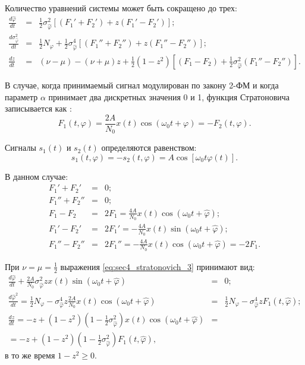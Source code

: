 Количество уравнений системы может быть сокращено до трех:
\begin{eqnarray}
	\label{eq:sec4_stratonovich_3}
	\frac{d \hat{\varphi}}{dt} & = & \frac{1}{2}\sigma_{\hat{\varphi}}^2 \left[(F_{1}' + F_{2}') + z(F_{1}' - F_{2}') \right]; \nonumber \\
	\frac{d \sigma_{\hat{\varphi}}^2}{dt} & = & \frac{1}{2}N_{\varphi} + \frac{1}{2}\sigma_{\hat{\varphi}}^4 \left[ (F_{1}'' + F_{2}'') +  z(F_{1}'' - F_{2}'') \right]; \\
	\frac{dz}{dt} & = & (\nu - \mu) - (\nu + \mu)z + \frac{1}{2}(1 - z^2) \left[ (F_{1} - F_{2}) +  \frac{1}{2} \sigma_{\hat{\varphi}}^2 (F_{1}'' - F_{2}'') \right]. \nonumber
\end{eqnarray}

В случае, когда принимаемый сигнал модулирован по закону 2-ФМ и когда параметр ${\alpha}$ принимает два дискретных значения 0 и 1,
функция Стратоновича записывается как \cite{shahtarin-wiener-kalman}:
\begin{equation}
	\label{eq:sec4_stratonovich_bpsk}
	F_1(t, \varphi) = \frac{2A}{N_0}x(t) \cos (\omega_0 t + \varphi) = -F_2(t, \varphi).
\end{equation}

Сигналы ${s_1(t)}$ и ${s_2(t)}$ определяются равенством: 
\begin{equation}
	\label{eq:sec4_s1_s2}
	s_1(t, \varphi) = -s_2(t, \varphi) = A \cos \left[ \omega_0 t \varphi(t) \right].
\end{equation}

В данном случае:
\begin{eqnarray}
	\label{eq:sec4_strat_der}
	F_1' + F_2' & = & 0; \nonumber \\
	F_1'' + F_2'' & = & 0; \nonumber \\
	F_1 - F_2 & = & 2F_1 = \frac{4A}{N_0}x(t) \cos(\omega_0 t + \hat{\varphi}); \\
	F_1' - F_2' & = & 2F_1' = -\frac{4A}{N_0}x(t) \sin(\omega_0 t + \hat{\varphi}); \nonumber \\
	F_1'' - F_2'' & = & 2F_1'' = -\frac{4A}{N_0}x(t) \cos(\omega_0 t + \hat{\varphi}) = -2F_1. \nonumber
\end{eqnarray}

При ${\nu = \mu = \frac{1}{2}}$ выражения \ref{eq:sec4_stratonovich_3} принимают вид:
\begin{eqnarray}
	\label{eq:sec4_strat_der111}
	\frac{d \hat{\varphi}}{dt} + \frac{2A}{N_0} \sigma_{\hat{\varphi}}^2 z x(t) \sin (\omega_0 t + \hat{\varphi}) & = & 0; \nonumber \\
	\frac{d \hat{\varphi}^2}{dt} = \frac{1}{2} N_{\varphi} - \sigma_{\hat{\varphi}}^4 z \frac{2A}{N_0} x(t) \cos(\omega_0 t + \hat{\varphi}) & = & \frac{1}{2}N_{\varphi} - \sigma_{\hat{\varphi}}^4 zF_1(t, \hat{\varphi}); \nonumber \\
	\frac{dz}{dt} = -z + (1 - z^2) \left( 1 - \frac{1}{2} \sigma_{\hat{\varphi}}^2 \right) x(t) \cos(\omega_0 t + \hat{\varphi}) & = & \nonumber \\
		 = -z + (1 - z^2) \left( 1 - \frac{1}{2} \sigma_{\hat{\varphi}}^2 \right) F_1(t, \hat{\varphi}), & &
\end{eqnarray}
в то же время ${1 - z^2 \ge 0}$.


